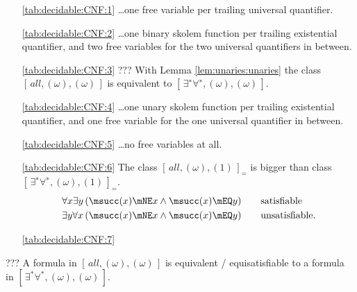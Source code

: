 \begin{itemize}
	\item[\ref{tab:decidable:CNF:1}]
	\ldots one free variable per trailing universal quantifier.

	\item[\ref{tab:decidable:CNF:2}]
	\ldots one binary skolem function per trailing existential quantifier,
	and two free variables for the two universal quantifiers in between.

	\item[\ref{tab:decidable:CNF:3}]
	??? With Lemma \ref{lem:unaries:unaries} the class \( [\,all, (\omega), (\omega)\,] \)
	is equivalent to \( [\,\exists^{∗}\forall^{∗}, (\omega), (\omega)\,] \).

	\item[\ref{tab:decidable:CNF:4}]
	\ldots one unary skolem function per trailing existential quantifier,
	and one free variable for the one universal quantifier in between.

	\item[\ref{tab:decidable:CNF:5}]
	\ldots no free variables at all.

	\item[\ref{tab:decidable:CNF:6}]
	The class \( [\,all, (\omega), (1)\,]_= \)
	is bigger than class \( [\,\exists^{∗}\forall^{∗}, (\omega), (1)\,]_= \).
\begin{align*}
	\forall x \exists y\,&(\msucc(x)\mNE x\land \msucc(x)\mEQ y)\tag*{satisfiable}
	\\
	\exists y \forall x\,&(\msucc(x)\mNE x\land \msucc(x)\mEQ y)\tag*{unsatisfiable}.
	\end{align*}
	\item[\ref{tab:decidable:CNF:7}]
\end{itemize}

\begin{lemma}\label{lem:unaries:unaries}
	??? A formula in \( [\,all, (\omega), (\omega)\,] \) is equivalent / equisatisfiable
	to a formula in \( [\,\exists^*\forall^*, (\omega), (\omega)\,] \).
\end{lemma}

